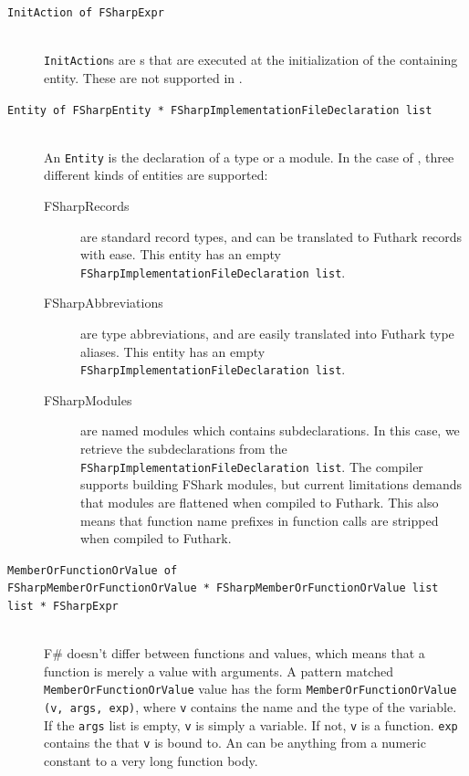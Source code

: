 \begin{description}
\item[\texttt{InitAction of FSharpExpr}] \hfill\\
  \texttt{InitAction}s are \fsharpexpr{}s that are executed at the
  initialization of the containing entity. These are not supported in \fshark{}.

\item[\texttt{Entity of FSharpEntity * FSharpImplementationFileDeclaration list}]\hfill\\
  An \texttt{Entity} is the declaration of a type or a module. In the case of
  \fshark{}, three different kinds of entities are supported:
  \begin{description}
  \item[FSharpRecords] are standard record types, and can be translated to
    Futhark records with ease.
    This entity has an empty \texttt{FSharpImplementationFileDeclaration list}.
  \item[FSharpAbbreviations] are type abbreviations, and are easily translated
    into Futhark type aliases.
    This entity has an empty \texttt{FSharpImplementationFileDeclaration list}.
  \item[FSharpModules] are named modules which contains subdeclarations.
    In this case, we retrieve the subdeclarations from the \texttt{FSharpImplementationFileDeclaration list}.
    The \fshark{} compiler supports building FShark modules, but current
    limitations demands that modules are flattened when compiled to Futhark.
    This also means that function name prefixes in function calls are stripped
    when compiled to Futhark.
  \end{description}
\item[\texttt{MemberOrFunctionOrValue of \\ FSharpMemberOrFunctionOrValue *
    FSharpMemberOrFunctionOrValue list list * FSharpExpr}]\hfill\\
  F\# doesn't differ between functions and values, which means that a function
  is merely a value with arguments.
  A pattern matched \texttt{MemberOrFunctionOrValue} value has the form
  \texttt{MemberOrFunctionOrValue (v, args, exp)}, where \texttt{v} contains the
  name and the type of the variable.
  If the \texttt{args} list is empty, \texttt{v} is simply a variable. If not,
  \texttt{v} is a function. \texttt{exp} contains the \fsharpexpr{} that
  \texttt{v} is bound to. An \fsharpexpr{} can be anything from a numeric
  constant to a very long function body.
\end{description}

